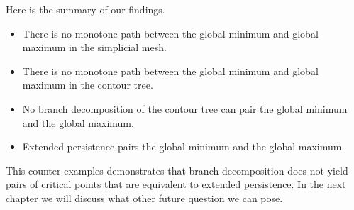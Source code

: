 Here is the summary of our findings.

\begin{itemize}
    \item There is no monotone path between the global minimum and global maximum in the simplicial mesh.
    \item There is no monotone path between the global minimum and global maximum in the contour tree.
    \item No branch decomposition of the contour tree can pair the global minimum and the global maximum.
    \item Extended persistence pairs the global minimum and the global maximum.
\end{itemize}

This counter examples demonstrates that branch decomposition does not yield pairs of critical points that are equivalent to extended persistence. In the next chapter we will discuss what other future question we can pose.

